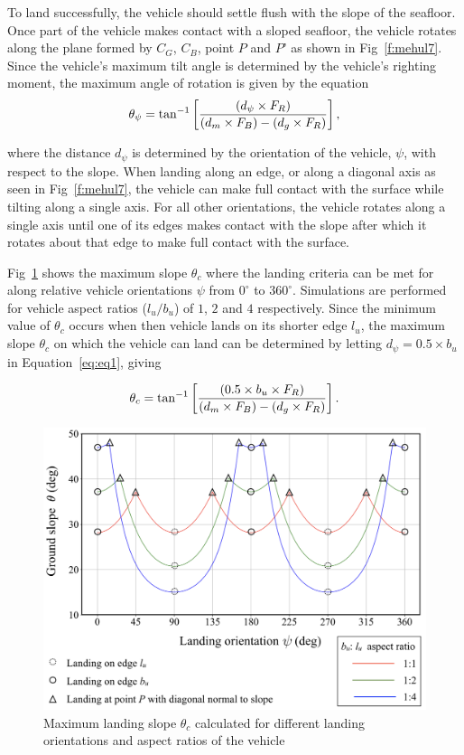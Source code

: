To land successfully, the vehicle should settle flush with the slope of the seafloor. Once part of the vehicle makes contact with a sloped seafloor, the vehicle rotates along the plane formed by $C_G$, $C_B$, point $P$ and $P$' as shown in Fig~\ref{f:mehul7}. Since the vehicle's maximum tilt angle is determined by the vehicle's righting moment, the maximum angle of rotation is given by the equation
\begin{equation}
\label{eq:eq1}
\centering
	\theta_\psi = \tan^{-1}\left[ \frac{(d_{\psi} \times F_R)}{(d_m \times F_B) - (d_g \times F_R)}\right],
\end{equation}

\noindent where the distance $d_{\psi}$ is determined by the orientation of the vehicle, $\psi$, with respect to the slope. When landing along an edge, or along a diagonal axis as seen in Fig~\ref{f:mehul7}, the vehicle can make full contact with the surface while tilting along a single axis. For all other orientations, the vehicle rotates along a single axis until one of its edges makes contact with the slope after which it rotates about that edge to make full contact with the surface. 


Fig~\ref{f:mehul8} shows the maximum slope $\theta_c$ where the landing criteria can be met for along relative  vehicle orientations $\psi$ from $0^\circ$ to  $360^\circ$. Simulations are performed for vehicle aspect ratios ($l_u/b_u$) of $1$, $2$ and $4$ respectively. Since the minimum value of $\theta_c$ occurs when then vehicle lands on its shorter edge $l_u$, the maximum slope $\theta_c$ on which the vehicle can land can be determined by letting $d_{\psi} = 0.5 \times b_u$ in Equation~\ref{eq:eq1}, giving

\begin{equation}
\label{eq:eq2}
\centering
	\theta_c = \tan^{-1}\left[ \frac{(0.5 \times b_u \times F_R)}{(d_m \times F_B) - (d_g \times F_R)}\right].
\end{equation}

\begin{figure}[!ht]
\centering
\includegraphics[width=6in]{./images/mehul8.png}
\caption{Maximum landing slope $\theta_c$ calculated for different landing orientations and aspect ratios of the vehicle}
\label{f:mehul8}
\end{figure}

